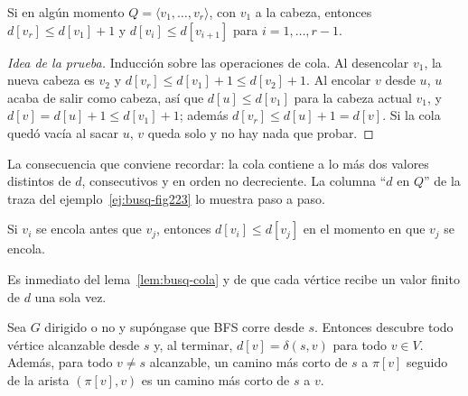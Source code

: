 \documentclass[11pt,letterpaper]{article}
\begin{document}
\begin{lema}
  \label{lem:busq-cola}
  Si en algún momento $Q = \langle v_1, \dots, v_r \rangle$, con $v_1$
  a la cabeza, entonces $d[v_r] \leq d[v_1] + 1$ y
  $d[v_i] \leq d[v_{i+1}]$ para $i = 1, \dots, r - 1$.
\end{lema}

\begin{proof}[Idea de la prueba]
  Inducción sobre las operaciones de cola. Al desencolar $v_1$, la
  nueva cabeza es $v_2$ y $d[v_r] \leq d[v_1] + 1 \leq d[v_2] + 1$.
  Al encolar $v$ desde $u$, $u$ acaba de salir como cabeza, así que
  $d[u] \leq d[v_1]$ para la cabeza actual $v_1$, y
  $d[v] = d[u] + 1 \leq d[v_1] + 1$; además
  $d[v_r] \leq d[u] + 1 = d[v]$. Si la cola quedó vacía al sacar $u$,
  $v$ queda solo y no hay nada que probar.
\end{proof}

La consecuencia que conviene recordar: la cola contiene a lo más dos
valores distintos de $d$, consecutivos y en orden no decreciente. La
columna ``$d$ en $Q$'' de la traza del
ejemplo~\ref{ej:busq-fig223} lo muestra paso a paso.

\begin{corolario}
  \label{cor:busq-orden-cola}
  Si $v_i$ se encola antes que $v_j$, entonces $d[v_i] \leq d[v_j]$
  en el momento en que $v_j$ se encola.
\end{corolario}

Es inmediato del lema~\ref{lem:busq-cola} y de que cada vértice recibe
un valor finito de $d$ una sola vez.

\begin{teorema}
  \label{teo:busq-correccion-bfs}
  Sea $G$ dirigido o no y supóngase que BFS corre desde $s$. Entonces
  descubre todo vértice alcanzable desde $s$ y, al terminar,
  $d[v] = \delta(s, v)$ para todo $v \in V$. Además, para todo
  $v \neq s$ alcanzable, un camino más corto de $s$ a $\pi[v]$
  seguido de la arista $(\pi[v], v)$ es un camino más corto de $s$ a
  $v$.
\end{teorema}
\end{document}
